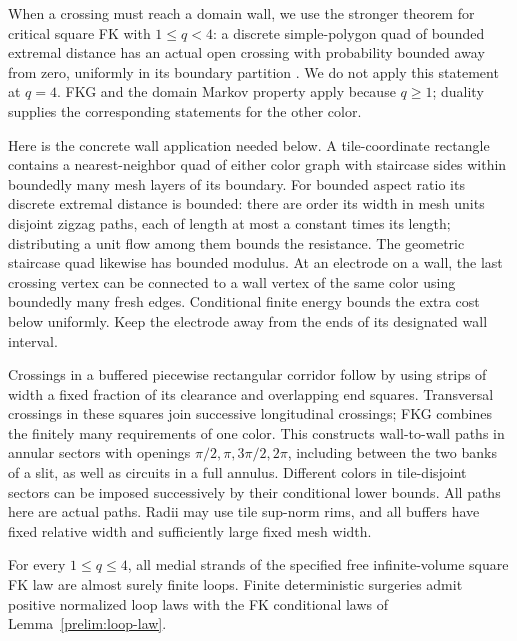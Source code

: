 When a crossing must reach a domain wall, we use the stronger theorem for
critical square FK with $1\le q<4$: a discrete simple-polygon quad of
bounded extremal distance has an actual open crossing with probability
bounded away from zero, uniformly in its boundary partition
\citep[Theorem~1.2]{DMT2021Fractal}. We do not apply this statement at $q=4$.
FKG and the domain Markov property apply because $q\ge1$; duality supplies
the corresponding statements for the other color.

Here is the concrete wall application needed below. A tile-coordinate
rectangle contains a nearest-neighbor quad of either color graph with
staircase sides within boundedly many mesh layers of its boundary.
For bounded aspect ratio its discrete extremal distance is bounded:
there are order its width in mesh units disjoint zigzag paths, each of
length at most a constant times its length; distributing a unit flow among
them bounds the resistance. The geometric staircase quad likewise has
bounded modulus. At an electrode on a wall, the last crossing vertex can
be connected to a wall vertex of the same color using boundedly many fresh
edges. Conditional finite energy bounds the extra cost below uniformly.
Keep the electrode away from the ends of its designated wall interval.

Crossings in a buffered piecewise rectangular corridor follow by using
strips of width a fixed fraction of its clearance and overlapping end
squares. Transversal crossings in these squares join successive
longitudinal crossings; FKG combines the finitely many requirements of one
color. This constructs wall-to-wall paths in annular sectors with openings
$\pi/2,\pi,3\pi/2,2\pi$, including between the two banks of a slit, as
well as circuits in a full annulus. Different colors in tile-disjoint
sectors can be imposed successively by their conditional lower bounds.
All paths here are actual paths. Radii may use tile sup-norm rims, and all
buffers have fixed relative width and sufficiently large fixed mesh width.

\begin{lemma}\label{prelim:finite-loops}
For every $1\le q\le4$, all medial strands of the specified free
infinite-volume square FK law are almost surely finite loops.
Finite deterministic surgeries admit positive normalized loop laws with
the FK conditional laws of Lemma~\ref{prelim:loop-law}.
\end{lemma}

